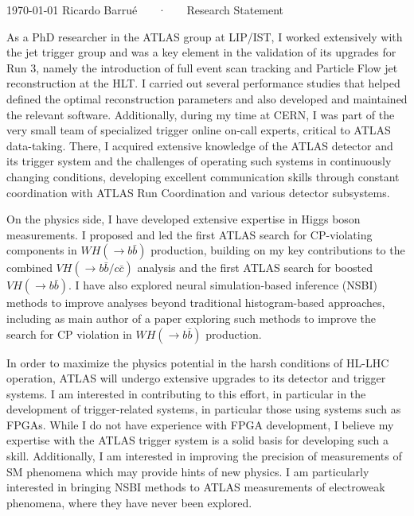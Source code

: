 \documentclass[11pt, a4paper]{awesome-cv}
\begin{document}
\makecvheader[R]

\makecvfooter
  {\today}
  {Ricardo Barrué ~~~·~~~ Research Statement}
  {}

\makelettertitle

\begin{cvletter}

As a PhD researcher in the ATLAS group at LIP/IST, I worked extensively with the jet trigger group and was a key element in the validation of its upgrades for Run 3, namely the introduction of full event scan tracking and Particle Flow jet reconstruction at the HLT. I carried out several performance studies that helped defined the optimal reconstruction parameters and also developed and maintained the relevant software. Additionally, during my time at CERN, I was part of the very small team of specialized trigger online on-call experts, critical to ATLAS data-taking. There, I acquired extensive knowledge of the ATLAS detector and its trigger system and the challenges of operating such systems in continuously changing conditions, developing excellent communication skills through constant coordination with ATLAS Run Coordination and various detector subsystems.

On the physics side, I have developed extensive expertise in Higgs boson measurements. I proposed and led the first ATLAS search for CP-violating components in $WH(\to b\bar{b})$ production, building on my key contributions to the combined $VH(\to b\bar{b}/c\bar{c})$ analysis and the first ATLAS search for boosted $VH(\to b\bar{b})$. I have also explored neural simulation-based inference (NSBI) methods to improve analyses beyond traditional histogram-based approaches, including as main author of a paper exploring such methods to improve the search for CP violation in $WH(\to b\bar{b})$ production.

In order to maximize the physics potential in the harsh conditions of HL-LHC operation, ATLAS will undergo extensive upgrades to its detector and trigger systems. I am interested in contributing to this effort, in particular in the development of trigger-related systems, in particular those using systems such as FPGAs. While I do not have experience with FPGA development, I believe my expertise with the ATLAS trigger system is a solid basis for developing such a skill. Additionally, I am interested in improving the precision of measurements of SM phenomena which may provide hints of new physics. I am particularly interested in bringing NSBI methods to ATLAS measurements of electroweak phenomena, where they have never been explored.
  

\end{cvletter}
\end{document}
